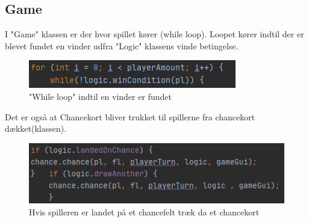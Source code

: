\subsection{Game}
I "Game" klassen er der hvor spillet kører (while loop). Loopet kører indtil der er blevet fundet en vinder udfra "Logic" klassens vinde betingelse. 
\begin{figure}[H]
    \centering
    \includegraphics{sources/7_implementering/gameLoop.PNG}
    \caption{"While loop" indtil en vinder er fundet}
    \label{fig:mainLoop}
\end{figure}

Det er også at Chancekort bliver trukket til spillerne fra chancekort dækket(klassen).

\begin{figure}[H]
    \centering
    \includegraphics{sources/7_implementering/gameChance.PNG}
    \caption{Hvis spilleren er landet på et chancefelt træk da et chancekort}
    \label{fig:chance}
\end{figure}
